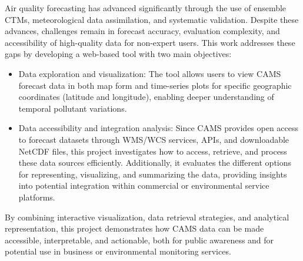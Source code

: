 Air quality forecasting has advanced significantly through the use of ensemble CTMs, meteorological data assimilation, and systematic validation. Despite these advances, challenges remain in forecast accuracy, evaluation complexity, and accessibility of high-quality data for non-expert users.
This work addresses these gaps by developing a web-based tool with two main objectives:
\begin{itemize}
	\item Data exploration and visualization: The tool allows users to view CAMS forecast data in both map form and time-series plots for specific geographic coordinates (latitude and longitude), enabling deeper understanding of temporal pollutant variations.
	\item Data accessibility and integration analysis: Since CAMS provides open access to forecast datasets through WMS/WCS services, APIs, and downloadable NetCDF files, this project investigates how to access, retrieve, and process these data sources efficiently. Additionally, it evaluates the different options for representing, visualizing, and summarizing the data, providing insights into potential integration within commercial or environmental service platforms.
\end{itemize}
By combining interactive visualization, data retrieval strategies, and analytical representation, this project demonstrates how CAMS data can be made accessible, interpretable, and actionable, both for public awareness and for potential use in business or environmental monitoring services.

